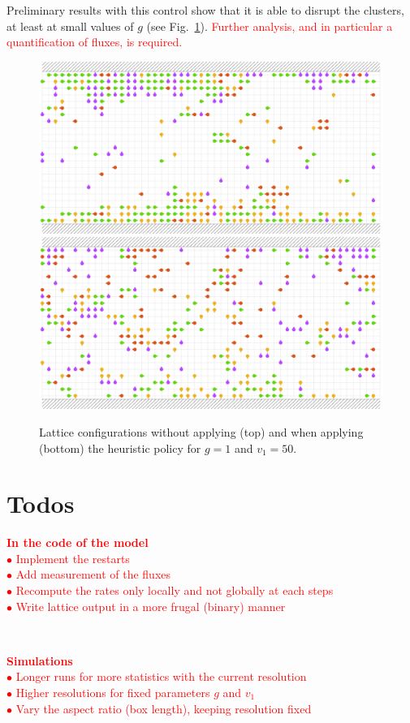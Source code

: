 \documentclass[aps,prl,twocolumn,amsmath,amssymb,superscriptaddress]{revtex4-1}
\newcommand{\obs}[1]{\textcolor{red}{#1}}
\begin{document}
Preliminary results with this control show that it is able to disrupt the clusters, at least at small values of $g$ (see Fig.~\ref{fig:swarm_channel}). \obs{Further analysis, and in particular a quantification of fluxes, is required.}
\begin{figure}[H]
    \centering
    \includegraphics[width=0.62\linewidth]{swarm_channel_nocontrol}\\[4pt]
    \includegraphics[width=0.62\linewidth]{swarm_channel_control}
    \caption{\label{fig:swarm_channel} Lattice configurations without applying (top) and when applying (bottom) the heuristic policy for $g=1$ and $v_1=50$.}
\end{figure}

\section{Todos}
\noindent\obs{\textbf{In the code of the model}}\\
\obs{$\bullet$ Implement the restarts}\\
\obs{$\bullet$ Add measurement of the fluxes}\\
\obs{$\bullet$ Recompute the rates only locally and not globally at each steps}\\
\obs{$\bullet$ Write lattice output in a more frugal (binary) manner}

\

\noindent\obs{\textbf{Simulations}}\\
\obs{$\bullet$ Longer runs for more statistics with the current resolution}\\
\obs{$\bullet$ Higher resolutions for fixed parameters $g$ and $v_1$}\\
\obs{$\bullet$ Vary the aspect ratio (box length), keeping resolution fixed}
\end{document}
